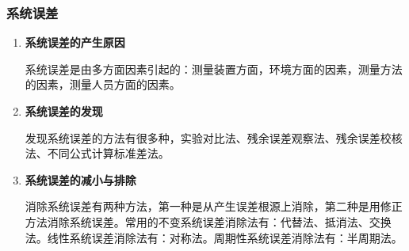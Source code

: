 \subsubsection{系统误差}
\begin{enumerate}
	\item \textbf{系统误差的产生原因}
	
	\qquad 系统误差是由多方面因素引起的：测量装置方面，环境方面的因素，测量方法的因素，测量人员方面的因素。
	\item \textbf{系统误差的发现}
	
	\qquad 发现系统误差的方法有很多种，实验对比法、残余误差观察法、残余误差校核法、不同公式计算标准差法。
	\item \textbf{系统误差的减小与排除}
	
	\qquad 消除系统误差有两种方法，第一种是从产生误差根源上消除，第二种是用修正方法消除系统误差。常用的不变系统误差消除法有：代替法、抵消法、交换法。线性系统误差消除法有：对称法。周期性系统误差消除法有：半周期法。
\end{enumerate}
